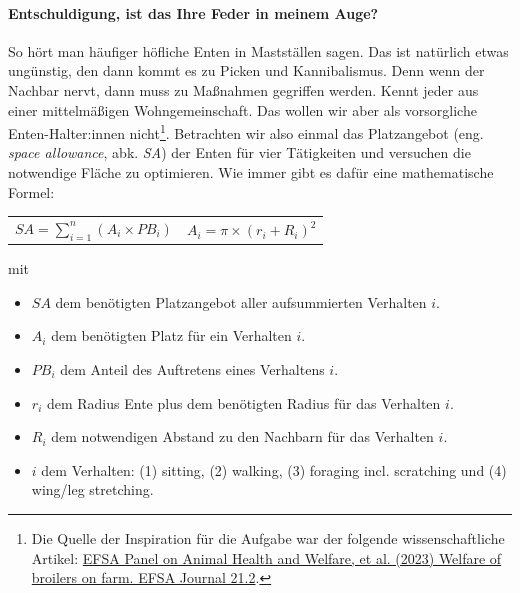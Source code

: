 \documentclass[a4paper, 9pt]{scrartcl}\usepackage[]{graphicx}\usepackage[]{xcolor}
\begin{document}
\paragraph{Entschuldigung, ist das Ihre Feder in meinem Auge?}



So h{\"o}rt man h{\"a}ufiger h{\"o}fliche Enten in Mastst{\"a}llen sagen. Das
ist nat{\"u}rlich etwas ung{\"u}nstig, den dann kommt es zu Picken und
Kannibalismus. Denn wenn der Nachbar nervt, dann muss zu Ma{\ss}nahmen
gegriffen werden. Kennt jeder aus einer mittelm{\"a}{\ss}igen Wohngemeinschaft. Das
wollen wir aber als vorsorgliche Enten-Halter:innen
nicht\footnote{Die Quelle der Inspiration f{\"u}r die Aufgabe war der folgende
  wissenschaftliche Artikel:
  \href{https://www.efsa.europa.eu/en/efsajournal/pub/7788}{EFSA Panel on
    Animal Health and Welfare, et al. (2023) Welfare of broilers on
    farm. EFSA Journal 21.2}.}. Betrachten wir also einmal das Platzangebot
(eng. \textit{space allowance}, abk. \textit{SA}) der Enten
f{\"u}r vier T{\"a}tigkeiten und versuchen die notwendige Fl{\"a}che zu optimieren. Wie
immer gibt es daf{\"u}r eine mathematische Formel:


\begin{center}
  \begin{tabular}{cc}
    $SA = \sum^n_{i = 1} (A_i \times PB_i)$ & $A_i = \pi \times (r_i + R_i)^2$\\
  \end{tabular}
\end{center}

\vspace{-2Ex}

mit

\begin{itemize}[noitemsep]
\item $SA$ dem ben{\"o}tigten Platzangebot aller aufsummierten Verhalten $i$.
\item $A_i$ dem ben{\"o}tigten Platz f{\"u}r ein Verhalten $i$. 
\item $PB_i$ dem Anteil des Auftretens eines Verhaltens $i$.
\item $r_i$ dem Radius Ente plus dem ben{\"o}tigten Radius f{\"u}r das Verhalten $i$.
\item $R_i$ dem notwendigen Abstand zu den Nachbarn f{\"u}r das Verhalten $i$.    
\item $i$ dem Verhalten: (1) sitting, (2) walking, (3)
  foraging incl. scratching und (4) wing/leg stretching.
\end{itemize}
\end{document}
